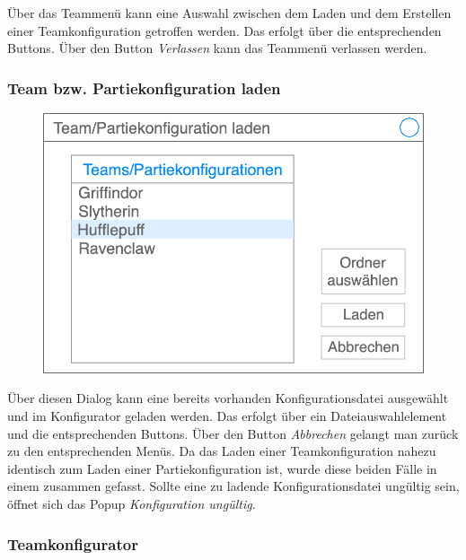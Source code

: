    Über das Teammenü kann eine Auswahl zwischen dem Laden und dem Erstellen einer Teamkonfiguration getroffen werden. Das erfolgt über die entsprechenden Buttons. Über den Button \textit{Verlassen} kann das Teammenü verlassen werden.

    \subsubsection{Team bzw. Partiekonfiguration laden}

    \begin{figure}[H]
        \centering
        \includegraphics[width=\textwidth/2]{../Meilenstein03/images/laden}
    \end{figure}

    Über diesen Dialog kann eine bereits vorhanden Konfigurationsdatei ausgewählt und im Konfigurator geladen werden. Das erfolgt über ein Dateiauswahlelement und die entsprechenden Buttons. Über den Button \textit{Abbrechen} gelangt man zurück zu den entsprechenden Menüs. Da das Laden einer Teamkonfiguration nahezu identisch zum Laden einer Partiekonfiguration ist, wurde diese beiden Fälle in einem zusammen gefasst. Sollte eine zu ladende Konfigurationsdatei ungültig sein, öffnet sich das Popup \textit{Konfiguration ungültig}.


    \subsubsection{Teamkonfigurator}


